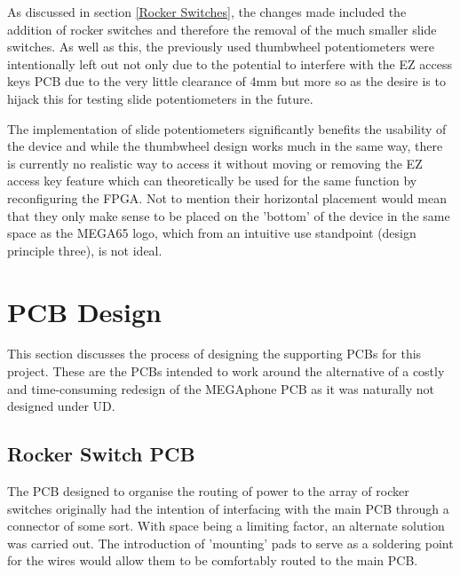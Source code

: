 As discussed in section \ref{Rocker Switches}, the changes made included the addition of rocker switches and therefore the removal of the much smaller slide switches. %
As well as this, the previously used thumbwheel potentiometers were intentionally left out not only due to the potential to interfere with the EZ access keys PCB due to the very little clearance of 4mm but more so as the desire is to hijack this for testing slide potentiometers in the future.

The implementation of slide potentiometers significantly benefits the usability of the device and while the thumbwheel design works much in the same way, there is currently no realistic way to access it without moving or removing the EZ access key feature which can theoretically be used for the same function by reconfiguring the FPGA.
Not to mention their horizontal placement would mean that they only make sense to be placed on the 'bottom' of the device in the same space as the MEGA65 logo, which from an intuitive use standpoint (design principle three), is not ideal.


\section{PCB Design} \label{PCBs}
This section discusses the process of designing the supporting PCBs for this project.
These are the PCBs intended to work around the alternative of a costly and time-consuming redesign of the MEGAphone PCB as it was naturally not designed under UD.

\subsection{Rocker Switch PCB}

The PCB designed to organise the routing of power to the array of rocker switches originally had the intention of interfacing with the main PCB through a connector of some sort.
With space being a limiting factor, an alternate solution was carried out.
The introduction of 'mounting' pads to serve as a soldering point for the wires would allow them to be comfortably routed to the main PCB.

